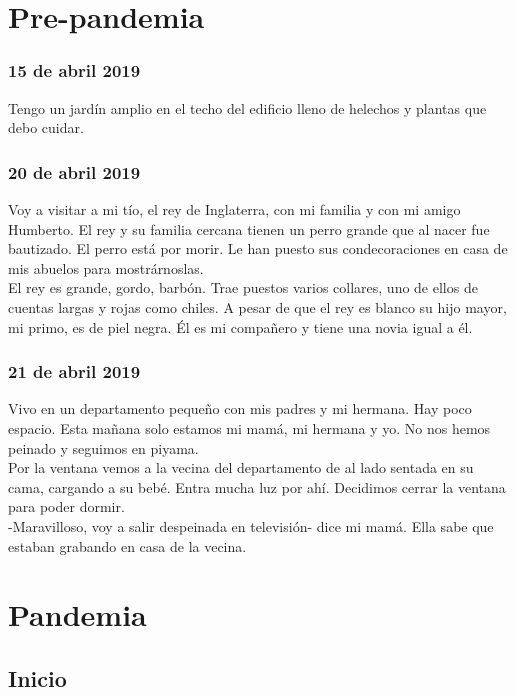 \documentclass[12pt]{book}
\begin{document}
\chapter{Pre-pandemia}

\subsection*{\hfill 15 de abril 2019}

Tengo un jardín amplio en el techo del edificio lleno de helechos y plantas que debo cuidar.

\subsection*{\hfill 20 de abril 2019}

Voy a visitar a mi tío, el rey de Inglaterra, con mi familia y con mi amigo Humberto. El rey y su familia cercana tienen un perro grande que al nacer fue bautizado. El perro está por morir. Le han puesto sus condecoraciones en casa de mis abuelos para mostrárnoslas.
\\
El rey es grande, gordo, barbón. Trae puestos varios collares, uno de ellos de cuentas largas y rojas como chiles. A pesar de que el rey es blanco su hijo mayor, mi primo, es de piel negra. Él es mi compañero y tiene una novia igual a él.

\subsection*{\hfill 21 de abril 2019}

Vivo en un departamento pequeño con mis padres y mi hermana. Hay poco espacio. Esta mañana solo estamos mi mamá, mi hermana y yo. No nos hemos peinado y seguimos en piyama. 
\\
Por la ventana vemos a la vecina del departamento de al lado sentada en su cama, cargando a su bebé. Entra mucha luz por ahí. Decidimos cerrar la ventana para poder dormir.
\\
-Maravilloso, voy a salir despeinada en televisión- dice mi mamá. Ella sabe que estaban grabando en casa de la vecina.


\chapter{Pandemia}

\section{Inicio}
\end{document}
